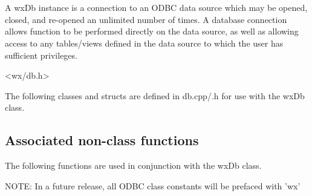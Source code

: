 \section{}\label{wxdb}

A wxDb instance is a connection to an ODBC data source which may
be opened, closed, and re-opened an unlimited number of times.  A
database connection allows function to be performed directly on the
data source, as well as allowing access to any tables/views defined in
the data source to which the user has sufficient privileges.


<wx/db.h>



The following classes and structs are defined in db.cpp/.h for use with the wxDb class.

\begin{itemize}\itemsep=0pt
\end{itemize}

\subsection{Associated non-class functions}\label{wxdbfunctions}

The following functions are used in conjunction with the wxDb class.








NOTE: In a future release, all ODBC class constants will be prefaced with 'wx'

